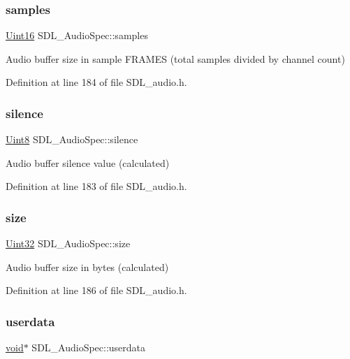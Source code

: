 \subsubsection{\texorpdfstring{samples}{samples}}
{\footnotesize\ttfamily \mbox{\hyperlink{_s_d_l__stdinc_8h_a31fcc0a076c9068668173ee26d33e42b}{Uint16}} S\+D\+L\+\_\+\+Audio\+Spec\+::samples}

Audio buffer size in sample F\+R\+A\+M\+ES (total samples divided by channel count) 

Definition at line 184 of file S\+D\+L\+\_\+audio.\+h.

\mbox{\label{struct_s_d_l___audio_spec_addc462c8a806e6c122eccf63482048f6}} 
\subsubsection{\texorpdfstring{silence}{silence}}
{\footnotesize\ttfamily \mbox{\hyperlink{_s_d_l__stdinc_8h_a2944638813a090aa23e62f4da842c3e2}{Uint8}} S\+D\+L\+\_\+\+Audio\+Spec\+::silence}

Audio buffer silence value (calculated) 

Definition at line 183 of file S\+D\+L\+\_\+audio.\+h.

\mbox{\label{struct_s_d_l___audio_spec_a154cf44743ecec78c36dc6c827dd2fdb}} 
\subsubsection{\texorpdfstring{size}{size}}
{\footnotesize\ttfamily \mbox{\hyperlink{_s_d_l__stdinc_8h_add440eff171ea5f55cb00c4a9ab8672d}{Uint32}} S\+D\+L\+\_\+\+Audio\+Spec\+::size}

Audio buffer size in bytes (calculated) 

Definition at line 186 of file S\+D\+L\+\_\+audio.\+h.

\mbox{\label{struct_s_d_l___audio_spec_aeec9481666f5f0982c98d3878f175d9b}} 
\subsubsection{\texorpdfstring{userdata}{userdata}}
{\footnotesize\ttfamily \mbox{\hyperlink{_s_d_l__opengles2__gl2ext_8h_ae5d8fa23ad07c48bb609509eae494c95}{void}}$\ast$ S\+D\+L\+\_\+\+Audio\+Spec\+::userdata}


